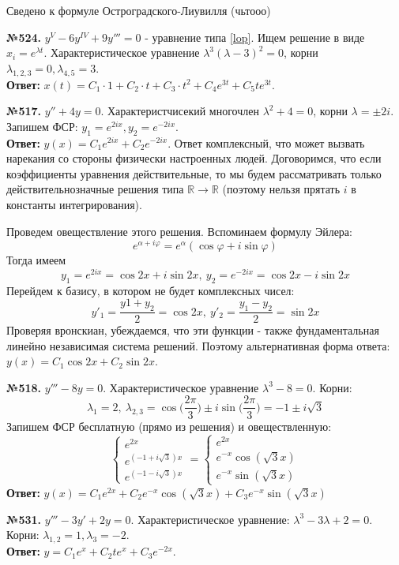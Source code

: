 Сведено к формуле Остроградского-Лиувилля (чьтооо)

\textbf{№524.} $y^V-6y^{IV}+9y'''=0$ - уравнение типа \ref{lop}.
Ищем решение в виде $x_i = e^{\lambda t}$. 
Характеристическое уравнение $\lambda^3(\lambda-3)^2=0$,
корни $\lambda_{1,2,3}=0,\lambda_{4,5}=3$. \\
\textbf{Ответ:} $x(t)=C_1\cdot 1+
C_2\cdot t+C_3\cdot t^2+C_4e^{3t}+C_5te^{3t}$. 

\textbf{№517.} $y''+4y=0$. Характеристчисекий многочлен  $\lambda^2+4=0$,
корни $\lambda=\pm 2i$. Запишем ФСР: 
$y_1=e^{2ix},y_2=e^{-2ix}$.\\
\textbf{Ответ:} $y(x) = C_1e^{2ix} + C_2e^{-2ix}$.
Ответ комплексный, что может вызвать нарекания со стороны физически
настроенных людей. Договоримся, что если коэффициенты уравнения 
действительные, то мы будем рассматривать только действительнозначные 
решения типа $\mathbb{R}\to \mathbb{R}$ (поэтому нельзя прятать 
$i$ в константы интегрирования). 

Проведем овеществление этого решения. Вспоминаем формулу Эйлера:
$$\boxed{e^{\alpha+i\varphi}=e^\alpha(\cos\varphi+i\sin\varphi)}$$ 
Тогда имеем
$$y_1=e^{2ix}=\cos 2x + i\sin2x,~y_2=e^{-2ix}=\cos 2x -i\sin 2x$$
Перейдем к базису, в котором не будет комплексных чисел:
$$y'_1=\frac{y1+y_2}{2}=\cos 2x,~y'_2 = \frac{y_1-y_2}{2} =\sin 2x$$
Проверяя вронскиан, убеждаемся, что эти функции - также фундаментальная
линейно независимая система решений. Поэтому альтернативная форма ответа:
$y(x) = C_1\cos 2x + C_2\sin 2x$. 



\textbf{№518.} $y'''-8y=0$. Характеристическое уравнение 
$\lambda^3 - 8 = 0$. Корни: $$\lambda_1 = 2,~\lambda_{2,3} = 
\cos\Big(\frac{2\pi}{3}\Big)\pm i\sin\Big(\frac{2\pi}{3}\Big)=-1\pm i\sqrt{3}$$
Запишем ФСР бесплатную (прямо из решения) и овеществленную:
$$\begin{cases}
    e^{2x} \\ e^{(-1+i\sqrt{3})x} \\ e^{(-1-i\sqrt{3})x} \end{cases} = 
\begin{cases}
    e^{2x} \\ e^{-x}\cos(\sqrt{3}x) \\ e^{-x}\sin(\sqrt{3}x)
\end{cases}$$
\textbf{Ответ:} $y(x) = 
C_1e^{2x} + C_2e^{-x}\cos(\sqrt{3}x)+C_3e^{-x}\sin(\sqrt{3}x )$


\textbf{№531.} $y'''-3y'+2y = 0$. 
Характеристическое уравнение: $\lambda^3-3\lambda+2=0$. 
Корни: $\lambda_{1,2}=1,\lambda_3=-2$.\\
\textbf{Ответ:} $y=C_1e^{x}+C_2te^{x}+C_3e^{-2x}$. 

